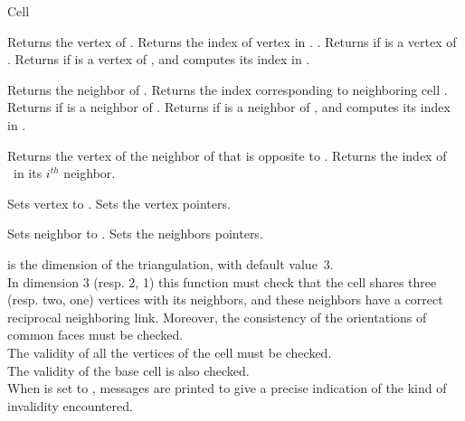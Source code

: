 \begin{ccRefConcept}[TriangulationDataStructure_3::]{Cell}
\ccOperations

\ccAccessFunctions

{Returns the vertex  of \ccVar.
}
\ccGlue
{}
{Returns the index of vertex  in \ccVar.
.}
\ccGlue
{}
{Returns  if   is a vertex of \ccVar.}
\ccGlue
{}
{Returns  if  is a vertex of \ccVar, and
computes its index  in \ccVar.}

{Returns  the neighbor  of \ccVar.
}
\ccGlue
{}
{Returns the index corresponding to neighboring cell .
}
\ccGlue
{}
{Returns  if  is a neighbor of \ccVar.}
\ccGlue
{}
{Returns  if  is a neighbor of \ccVar,  and
computes its index  in \ccVar.}

{Returns the vertex of the neighbor of \ccVar that is opposite to \ccVar.
}
{Returns the index of \ccVar\ in its $i^{th}$ neighbor.
}


{Sets vertex  to .
}
\ccGlue
{}
{Sets the vertex pointers.}

{Sets neighbor  to .
}
\ccGlue
{}
{Sets the neighbors pointers.}

{ is the dimension of the triangulation, with default
value~3.\\
In dimension 3 (resp. 2, 1) this function must check that the cell
shares three (resp. two, one) vertices with its neighbors, and these
neighbors have a correct reciprocal neighboring link. Moreover, the
consistency of the orientations of common faces must be checked.\\ 
The validity of all the vertices of the cell must be checked.\\
The validity of the base cell is also checked.\\ 
When  is set to , messages are printed to give
a precise indication of the kind of invalidity encountered.}


\end{ccRefConcept}
